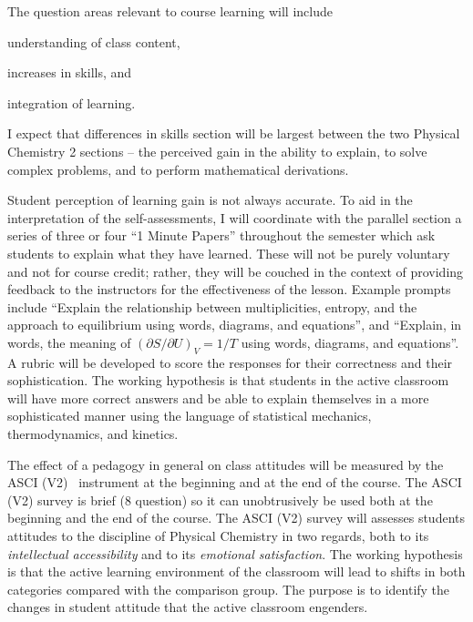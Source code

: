 \documentclass[10pt,letterpaper]{article}
\begin{document}
The question areas relevant to course learning will include
\begin{enumerate*}[label=\textbf{\arabic*.)}]
  \item understanding of class content,
\item increases in skills, and
\item integration of learning.
\end{enumerate*}
I expect that differences in skills section will be largest between the two Physical Chemistry 2 sections -- the perceived gain in the ability to explain, to solve complex problems, and to perform mathematical derivations. 

 Student perception of learning gain is not always accurate. To aid in the interpretation of the self-assessments, I will coordinate with the parallel section a series of three or four ``1 Minute Papers'' throughout the semester which ask students to explain what they have learned. These will not be purely voluntary and not for course credit; rather, they will be couched in the context of providing feedback to the instructors for the effectiveness of the lesson. Example prompts include ``Explain the relationship between multiplicities, entropy, and the approach to equilibrium using words, diagrams, and equations'', and ``Explain, in words, the meaning of $(\partial S/\partial U)_V = 1/T$ using words, diagrams, and equations''. A rubric will be developed to score the responses for their correctness and their sophistication. The working hypothesis is that students in the active classroom will have more correct answers and be able to explain themselves in a more sophisticated manner using the language of statistical mechanics, thermodynamics, and kinetics.

 The effect of a \pogil pedagogy in general on class attitudes will be measured by the ASCI (V2)~\cite{Xu2011} instrument at the beginning and at the end of the course. The ASCI (V2) survey is brief (8 question) so it can unobtrusively be used both at the beginning and the end of the course. The ASCI (V2) survey will assesses students attitudes to the discipline of Physical Chemistry in two regards, both to its \textit{intellectual accessibility} and to its \textit{emotional satisfaction}. The working hypothesis is that the active learning environment of the \pogil classroom will lead to shifts in both categories compared with the comparison group. The purpose is to identify the changes in student attitude that the active classroom engenders.
\end{document}
